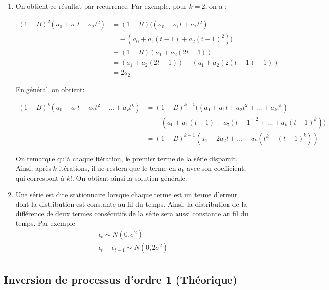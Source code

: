 \documentclass{article}
\begin{document}
\begin{enumerate}
  
\item On obtient ce résultat par récurrence. Par exemple, pour $k=2$, on a :

\begin{align*}
  (1-B)^2 (a_0+a_1t+a_2t^2) &= (1-B) ((a_0+a_1t+a_2t^2)\\ &\quad- (a_0+a_1(t-1)+a_2(t-1)^2)) \\
  &= (1-B) (a_1+a_2(2t+1)) \\
  &= (a_1+a_2(2t+1)) - (a_1+a_2(2(t-1)+1)) \\
  &= 2a_2
\end{align*}

En général, on obtient:

\begin{align*}
  (1-B)^k (a_0+a_1t+a_2t^2+\ldots+a_kt^k) &= (1-B)^{k-1} ((a_0+a_1t+a_2t^2+\ldots+a_kt^k)\\ &\quad- (a_0+a_1(t-1)+a_2(t-1)^2+\ldots+a_k(t-1)^k)) \\
  &= (1-B)^{k-1} (a_1 + 2a_2t+\ldots+a_k(t^k-(t-1)^k))
\end{align*}

On remarque qu'à chaque itération, le premier terme de la série disparait. Ainsi, après $k$ itérations, il ne restera que le terme en $a_k$ avec son coefficient, qui correspont à $k!$. On obtient ainsi la solution générale.

\item Une série est dite stationnaire lorsque chaque terme est un terme d'erreur dont la distribution est constante au fil du temps. Ainsi, la distribution de la différence de deux termes consécutifs de la série sera aussi constante au fil du temps. Par exemple:
  \begin{align*}
    \epsilon_t \sim N(0,\sigma^2)  \\
     \epsilon_t - \epsilon_{t-1} \sim N(0,2\sigma^2) \\
  \end{align*}

\end{enumerate}



\clearpage
\subsection{Inversion de processus d'ordre 1 (Théorique)}
\end{document}
